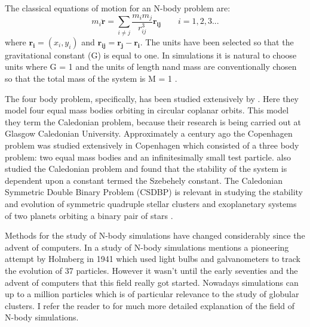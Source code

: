 \documentclass[a4paper,12pt]{article}
\begin{document}
The classical equations of motion for an N-body problem are:
\begin{equation}
m_i\mathbf{\ddot{r}}=\sum_{i\neq{j}}\frac{{m_i}{m_j}}{r^3_{ij}}\mathbf{r_{ij}}
\qquad
i=1,2,3...
\end{equation}
where $\mathbf{r_i}=\left(x_i,y_i\right)$ and $\mathbf{r_{ij}}=\mathbf{r_j}-\mathbf{r_i}$. 
The units have been selected so that the gravitational constant (G) is equal to one. In simulations it is natural to choose units where G = 1 and the units of length nand mass are conventionally chosen
so that the total mass of the system is M = 1 \citep{heggie}.

The four body problem, specifically, has been studied extensively by \cite{steves}. Here they model four equal mass bodies orbiting in circular coplanar orbits. This model they term the Caledonian problem, because
their research is being carried out at Glasgow Caledonian University.
Approximately a century ago the Copenhagen problem was studied extensively in Copenhagen which consisted of a three body problem: two equal mass bodies and an infinitesimally small test particle. \cite{szell} also
studied the Caledonian problem and found that the stability of the system is dependent upon a constant termed the Szebehely constant. The Caledonian Symmetric Double Binary Problem (CSDBP) is relevant in 
studying the stability and evolution of symmetric quadruple stellar clusters and exoplanetary systems of two planets orbiting a binary pair of stars \citep{alvarez}.

Methods for the study of N-body simulations have changed considerably since the advent of computers. In a study of N-body simulations \cite{trenti} mentions a pioneering attempt by Holmberg in 1941 which used 
light bulbs and galvanometers to track the evolution of 37 particles. However it wasn't until the early seventies and the advent of computers that this field really got started. 
Nowadays simulations can up to a million particles \citep{heggie} which is of particular relevance to the study of globular
clusters. I refer the reader to \cite{aarseth} for much more detailed explanation of the field of N-body simulations.
\end{document}
